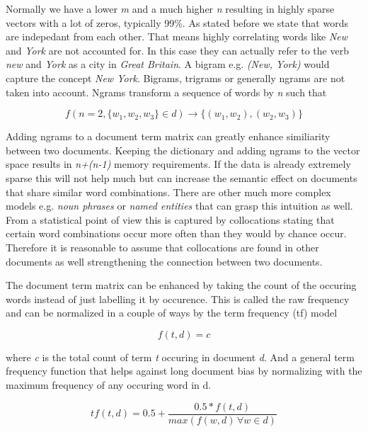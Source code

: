     Normally we have a lower \emph{m} and a much higher \emph{n} resulting in highly sparse vectors with a lot of zeros, typically 99\%. As stated before we state that words are indepedant from each other. That means highly correlating words like \emph{New} and \emph{York} are not accounted for. In this case they can actually refer to the verb \emph{new} and \emph{York} as a city in \emph{Great Britain}. A bigram e.g. \emph{(New, York)} would capture the concept \emph{New York}. Bigrams, trigrams or generally ngrams are not taken into account. Ngrams transform a sequence of words by \emph{n} such that 

      \begin{equation}
        f(n = 2, \{w_1, w_2, w_3\} \in d) \to \{(w_1, w_2),(w_2,w_3)\}
      \end{equation}

    Adding ngrams to a document term matrix can greatly enhance similiarity between two documents. Keeping the dictionary and adding ngrams to the vector space results in \emph{n+(n-1)} memory requirements. If the data is already extremely sparse this will not help much but can increase the semantic effect on documents that share similar word combinations. There are other much more complex models e.g. \emph{noun phrases} or \emph{named entities} that can grasp this intuition as well. From a statistical point of view this is captured by collocations stating that certain word combinations occur more often than they would by chance occur. Therefore it is reasonable to assume that collocations are found in other documents as well strengthening the connection between two documents.

    The document term matrix can be enhanced by taking the count of the occuring words instead of just labelling it by occurence. This is called the raw frequency and can be normalized in a couple of ways by the term frequency (tf) model
     
      \begin{equation}
        f(t,d) = c
      \end{equation}

    where \emph{c} is the total count of term \emph{t} occuring in document \emph{d}.
    And a general term frequency function that helps against long document bias by normalizing with the maximum frequency of any occuring word in d.

    \begin{equation}
      tf(t,d) = 0.5 + \frac{0.5 * f(t,d)}{max(f(w,d)\, \forall w \in d)}
    \end{equation}

